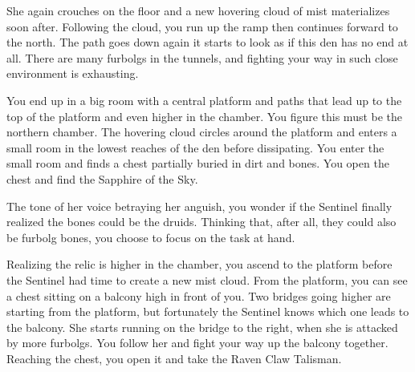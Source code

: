 

She again crouches on the floor and a new hovering cloud of mist materializes soon after. Following the cloud, you run up the ramp then continues forward to the north. The path goes down again it starts to look as if this den has no end at all. There are many furbolgs in the tunnels, and fighting your way in such close environment is exhausting.

You end up in a big room with a central platform and paths that lead up to the top of the platform and even higher in the chamber. You figure this must be the northern chamber. The hovering cloud circles around the platform and enters a small room in the lowest reaches of the den before dissipating. You enter the small room and finds a chest partially buried in dirt and bones. You open the chest and find the Sapphire of the Sky.


The tone of her voice betraying her anguish, you wonder if the Sentinel finally realized the bones could be the druids. Thinking that, after all, they could also be furbolg bones, you choose to focus on the task at hand.



Realizing the relic is higher in the chamber, you ascend to the platform before the Sentinel had time to create a new mist cloud. From the platform, you can see a chest sitting on a balcony high in front of you. Two bridges going higher are starting from the platform, but fortunately the Sentinel knows which one leads to the balcony. She starts running on the bridge to the right, when she is attacked by more furbolgs. You follow her and fight your way up the balcony together. Reaching the chest, you open it and take the Raven Claw Talisman.



